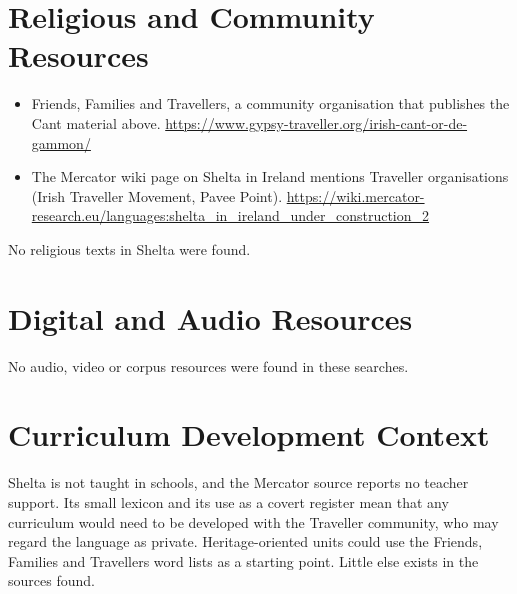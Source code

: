 \documentclass[12pt]{article}
\begin{document}
\section{Religious and Community Resources}
\begin{itemize}
\item Friends, Families and Travellers, a community organisation that publishes the Cant material above. \url{https://www.gypsy-traveller.org/irish-cant-or-de-gammon/}
\item The Mercator wiki page on Shelta in Ireland mentions Traveller organisations (Irish Traveller Movement, Pavee Point). \url{https://wiki.mercator-research.eu/languages:shelta_in_ireland_under_construction_2}
\end{itemize}
No religious texts in Shelta were found.

\section{Digital and Audio Resources}
No audio, video or corpus resources were found in these searches.

\section{Curriculum Development Context}
Shelta is not taught in schools, and the Mercator source reports no teacher support. Its small lexicon and its use as a covert register mean that any curriculum would need to be developed with the Traveller community, who may regard the language as private. Heritage-oriented units could use the Friends, Families and Travellers word lists as a starting point. Little else exists in the sources found.
\end{document}
